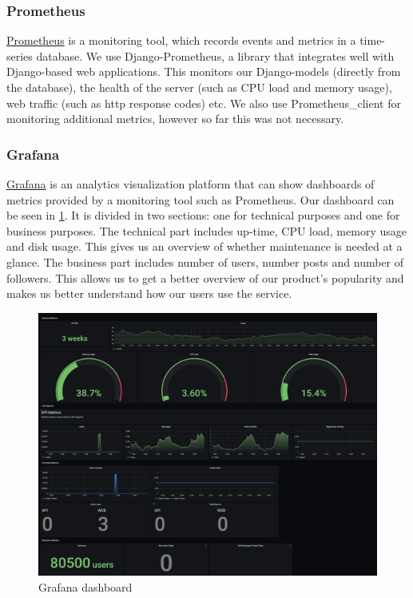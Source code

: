 \documentclass[12pt]{article}
\begin{document}
\subsubsection{Prometheus}
\href{https://Prometheus.io/}{Prometheus} is a monitoring tool, which records events and metrics in a time-series database. We use Django-Prometheus, a library that integrates well with Django-based web applications. This monitors our Django-models (directly from the database), the health of the server (such as CPU load and memory usage), web traffic (such as http response codes) etc. We also use Prometheus\_client for monitoring additional metrics, however so far this was not necessary. 

\subsubsection{Grafana}
\href{https://grafana.com/}{Grafana} is an analytics visualization platform that can show dashboards of metrics provided by a monitoring tool such as Prometheus. Our dashboard  can be seen in \ref{fig:dash}. It is divided in two sections: one for technical purposes and one for business purposes. The technical part includes up-time, CPU load, memory usage and disk usage. This gives us an overview of whether maintenance is needed at a glance. The business part includes number of users, number posts and number of followers. This allows us to get a better overview of our product's popularity and makes us better understand how our users use the service.
\begin{figure}[h!]
    \centering
    \includegraphics[width=12cm]{Dash}
    \caption{Grafana dashboard}
    \label{fig:dash}
\end{figure}
\end{document}
